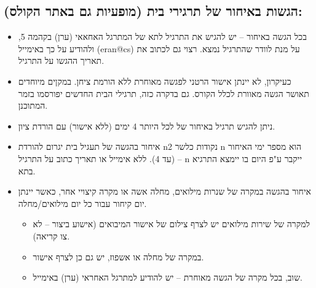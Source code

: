 \documentclass[10pt]{article}
\begin{document}
{\raggedleft
\subsection{הגשות באיחור של תרגירי בית (מופעיות גם באתר הקולס):}
}

\begin{itemize}
	\item {\large בכל הגשה באיחור -- יש להגיש את התרגיל לתא של המתרגל האחאאי (ערן) בקהמה
5, ולהודיע על כך באימייל (eran@cs) על מנת לוודר שהתרגיל נמצא. רצוי גם לכתוב את
תאריך ההגשו על התרגיל. }
	\item {\large כעיקרון, לא יינתן אישור הרטני לפגשה מאוחרת ללא הורמת ציחן. במקןים
מיוחדים תאושר הגשה מאוורת לכלל הקורס. גם בדקרה כזה, תרגילי הבית החדשים יפורסמו
בזמר המתוכנן.  }
	\item {\large ניתן להגיש תרגיל באיחור של לכל היותר 4 ימים (ללא אישור) עם הורדת ציון. 
}
	\item {\large איחור בהגשה של תעגיל בית יגרום להורדת n2 נקודות כלשר n הוא מספר ימי
האיחור (עד 4). ללא אימייל או תאריך כתוב על התרגיל -- n ייקבר ע"פ היום בו יימצא
התרגיא בתא.}
	\item {\large איחור בהגשה במקרה של שנרות מילואים, מחלה אשה או מקרה קיצויי אחר, כאשר
יינתן יום קיחור עבור כל יום מילואים/מחלה.}

\begin{itemize}
	\item {\large למקרה של שירות מילואים יש לצרף צילום של אישור המיבואים (אישוע ביצור --
לא צו קריאה).}
	\item {\large במקרה של מחלה או אשפוז, יש גם כן לצרף אישור.}
	\item {\large שוב, בכל מקרה של הגשה מאוחרת -- יש להודיע למתרגל האחראי (ערן) באימייל.}
\end{itemize}
\end{itemize}
\end{document}

